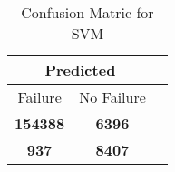 \begin{table}[] 
\caption{Confusion Matric for SVM} 
\label{Table: Prediction Accuracy-NoneSVMRandomForest100EKF-ignoreReflection-Reflection} 
\centering 
\begin{tabular} 
 {@{}ccc@{}} 
\toprule 
\multicolumn{2}{c}{\textbf{Predicted}}
 \\ \midrule 
\multicolumn{1}{|c|}{Failure} & 
\multicolumn{1}{c|}{No Failure}
 \\ \midrule 
\multicolumn{1}{|c|}{\color{green}\textbf{154388}} & 
\multicolumn{1}{c|}{\color{red}\textbf{6396}}
 \\ \midrule 
\multicolumn{1}{|c|}{\color{red}\textbf{937}} & 
\multicolumn{1}{c|}{\color{green}\textbf{8407}}
 \\ \bottomrule 
\end{tabular} 
\end{table} 
